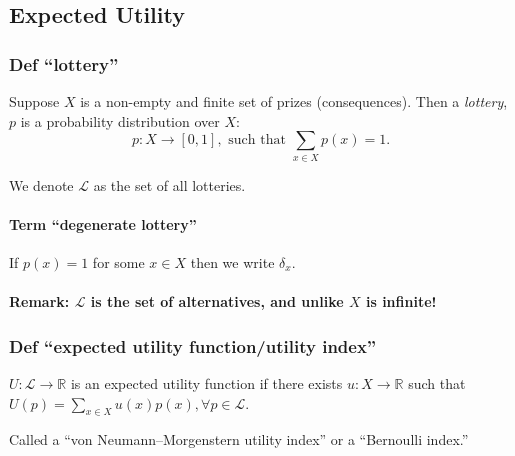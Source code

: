 \documentclass[
]{article}
\begin{document}
\hypertarget{expected-utility}{%
\subsection{Expected Utility}\label{expected-utility}}

\hypertarget{def-lottery}{%
\subsubsection{Def ``lottery''}\label{def-lottery}}

Suppose \(X\) is a non-empty and finite set of prizes (consequences).
Then a \emph{lottery}, \(p\) is a probability distribution over \(X\):
\[p: X \rightarrow [0,1], \text{ such that } \sum_{x\in X} p(x) = 1.\]

We denote \(\mathcal{L}\) as the set of all lotteries.

\hypertarget{term-degenerate-lottery}{%
\paragraph{Term ``degenerate lottery''}\label{term-degenerate-lottery}}

If \(p(x)=1\) for some \(x \in X\) then we write \(\delta_x\).

\hypertarget{remark-mathcall-is-the-set-of-alternatives-and-unlike-x-is-infinite}{%
\paragraph{\texorpdfstring{Remark: \(\mathcal{L}\) is the set of
alternatives, and unlike \(X\) is
infinite!}{Remark: \textbackslash mathcal\{L\} is the set of alternatives, and unlike X is infinite!}}\label{remark-mathcall-is-the-set-of-alternatives-and-unlike-x-is-infinite}}

\hypertarget{def-expected-utility-functionutility-index}{%
\subsubsection{Def ``expected utility function/utility
index''}\label{def-expected-utility-functionutility-index}}

\(U: \mathcal{L} \rightarrow \mathbb{R}\) is an expected utility
function if there exists \(u: X \rightarrow \mathbb{R}\) such that
\(U(p) = \sum_{x \in X} u(x)p(x), \forall p \in \mathcal{L}\).

Called a ``von Neumann--Morgenstern utility index'' or a ``Bernoulli
index.''
\end{document}
